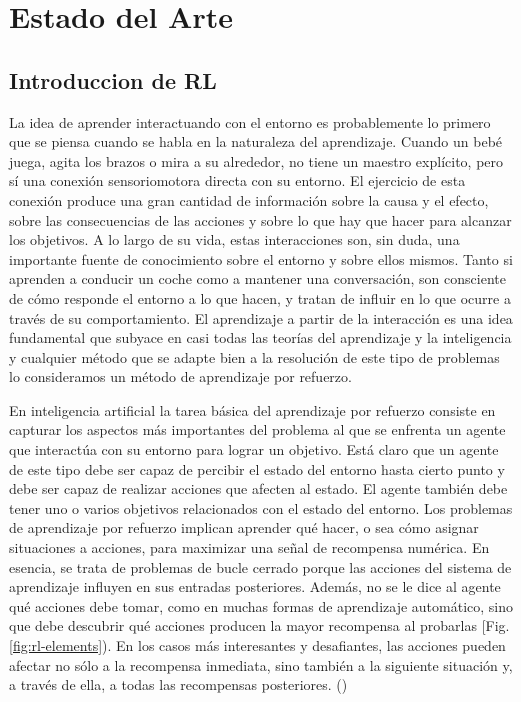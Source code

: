 \chapter{Estado del Arte}\label{chapter:state-of-the-art}

\section{Introduccion de RL}\label{section:state-of-the-art:introduction-to-RL}

La idea de aprender interactuando con el entorno es probablemente lo primero que se piensa cuando se habla en la naturaleza del aprendizaje. Cuando un bebé juega, agita los brazos o mira a su alrededor, no tiene un maestro explícito, pero sí una conexión sensoriomotora directa con su entorno. El ejercicio de esta conexión produce una gran cantidad de información sobre la causa y el efecto, sobre las consecuencias de las acciones y sobre lo que hay que hacer para alcanzar los objetivos. A lo largo de su vida, estas interacciones son, sin duda, una importante fuente de conocimiento sobre el entorno y sobre ellos mismos. Tanto si aprenden a conducir un coche como a mantener una conversación, son consciente de cómo responde el entorno a lo que hacen, y tratan de influir en lo que ocurre a través de su comportamiento. El aprendizaje a partir de la interacción es una idea fundamental que subyace en casi todas las teorías del aprendizaje y la inteligencia y cualquier método que se adapte bien a la resolución de este tipo de problemas lo consideramos un método de aprendizaje por refuerzo.

En inteligencia artificial la tarea básica del aprendizaje por refuerzo consiste en capturar los aspectos más importantes del problema al que se enfrenta un agente que interactúa con su entorno para lograr un objetivo. Está claro que un agente de este tipo debe ser capaz de percibir el estado del entorno hasta cierto punto y debe ser capaz de realizar acciones que afecten al estado. El agente también debe tener uno o varios objetivos relacionados con el estado del entorno. Los problemas de aprendizaje por refuerzo implican aprender qué hacer, o sea cómo asignar situaciones a acciones, para maximizar una señal de recompensa numérica. En esencia, se trata de problemas de bucle cerrado porque las acciones del sistema de aprendizaje influyen en sus entradas posteriores. Además, no se le dice al agente qué acciones debe tomar, como en muchas formas de aprendizaje automático, sino que debe descubrir qué acciones producen la mayor recompensa al probarlas [Fig. \ref{fig:rl-elements}). En los casos más interesantes y desafiantes, las acciones pueden afectar no sólo a la recompensa inmediata, sino también a la siguiente situación y, a través de ella, a todas las recompensas posteriores. (\cite{sutton1998introduction})


